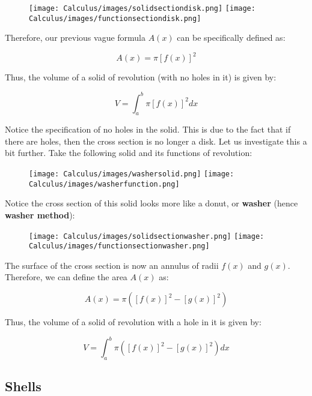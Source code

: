 \documentclass[11pt]{article}
\begin{document}
\begin{figure}[H]
    \hspace*{2cm}
    \texttt{[image: Calculus/images/solidsectiondisk.png]}
    \hspace*{2cm}
    \texttt{[image: Calculus/images/functionsectiondisk.png]}
\end{figure}

Therefore, our previous vague formula $A(x)$ can be specifically defined as:

\[ A(x) = \pi [f(x)]^2 \]

Thus, the volume of a solid of revolution (with no holes in it) is given by:

\[ V = \int_{a}^{b} \pi [f(x)]^2 dx \]

Notice the specification of no holes in the solid. This is due to the fact that if there are holes, then the cross section is no longer a disk. Let us investigate this a bit further. Take the following solid and its functions of revolution:

\begin{figure}[H]
    \hspace*{2cm}
    \texttt{[image: Calculus/images/washersolid.png]}
    \hspace*{2cm}
    \texttt{[image: Calculus/images/washerfunction.png]}
\end{figure}

Notice the cross section of this solid looks more like a donut, or \textbf{washer} (hence \textbf{washer method}):

\begin{figure}[H]
    \hspace*{2cm}
    \texttt{[image: Calculus/images/solidsectionwasher.png]}
    \hspace*{2cm}
    \texttt{[image: Calculus/images/functionsectionwasher.png]}
\end{figure}

The surface of the cross section is now an annulus of radii $f(x)$ and $g(x)$. Therefore, we can define the area $A(x)$ as:

\[ A(x) = \pi ([f(x)]^2 - [g(x)]^2) \]

Thus, the volume of a solid of revolution with a hole in it is given by:

\[ V = \int_{a}^{b} \pi ([f(x)]^2 - [g(x)]^2) dx \]
 
\subsection{Shells}
\end{document}
